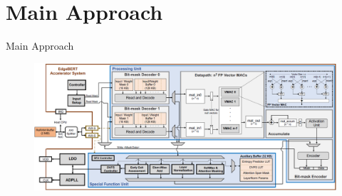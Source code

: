 \documentclass[12pt]{beamer}
\begin{document}
\section{Main Approach}
\begin{frame}{Main Approach}
\begin{figure}[H]
    \centering
    \includegraphics[width=1\textwidth]{1.png}
\end{figure}
\end{frame}
\end{document}
